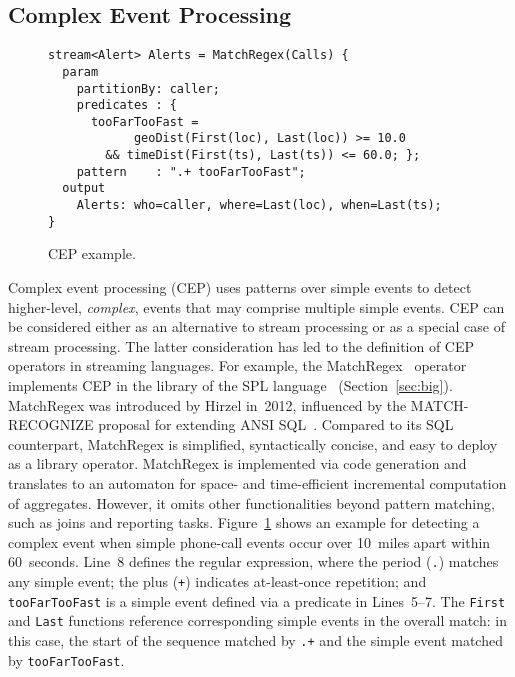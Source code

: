 \subsection{Complex Event Processing}\label{sec:cep} %

\begin{figure}[!h]
\begin{lstlisting}[morekeywords={stream,param,output}]
stream<Alert> Alerts = MatchRegex(Calls) {
  param
    partitionBy: caller;
    predicates : {
      tooFarTooFast =
            geoDist(First(loc), Last(loc)) >= 10.0
        && timeDist(First(ts), Last(ts)) <= 60.0; };
    pattern    : ".+ tooFarTooFast";
  output
    Alerts: who=caller, where=Last(loc), when=Last(ts);
}
\end{lstlisting}
\vspace*{-4mm}
\caption{\label{fig:cep}CEP example.}
\end{figure}

Complex event processing (CEP) uses patterns over simple events to
detect higher-level, \emph{complex}, events that may comprise multiple
simple events.  CEP can be considered either as an alternative to
stream processing or as a special case of stream processing. The
latter consideration has led to the definition of CEP operators in
streaming languages. For example, the \textsf{MatchRegex}~\cite{hirzel_2012}
operator implements CEP in the library of the SPL
language~\cite{hirzel_schneider_gedik_2017} (Section~\ref{sec:big}). MatchRegex was introduced by Hirzel in~2012,
influenced by the \mbox{\textsf{M{\small{}ATCH}-R{\small{}ECOGNIZE}}} proposal for extending ANSI
SQL~\cite{zemke_et_al_2007}.  Compared to its SQL counterpart,
MatchRegex is simplified, syntactically concise, and easy to deploy as
a library operator. MatchRegex is implemented via code generation and
translates to an automaton for space- and time-efficient incremental
computation of aggregates. However, it omits other
functionalities beyond pattern matching, such as joins and reporting
tasks. Figure~\ref{fig:cep} shows an example for detecting a complex
event when simple phone-call events occur over 10~miles apart within
60~seconds. Line~8 defines the regular expression, where the period
(\lstinline{.}) matches any simple event; the plus (\lstinline{+})
indicates at-least-once repetition; and \lstinline{tooFarTooFast} is a
simple event defined via a predicate in \mbox{Lines 5--7}. The
\lstinline{First} and \lstinline{Last} functions reference
corresponding simple events in the overall match: in this case, the
start of the sequence matched by \lstinline{.+} and the simple event matched by
\lstinline{tooFarTooFast}.

